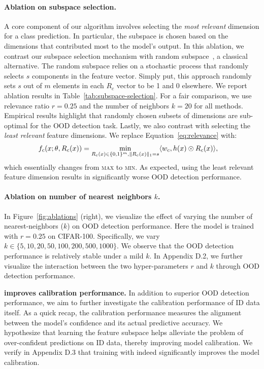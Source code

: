 \paragraph{Ablation on subspace selection.} A core component of our algorithm involves selecting the  \emph{most relevant} dimension for a class prediction. In particular, the subspace is chosen based on the dimensions that contributed most to the model's output. In this ablation, we contrast our subspace selection mechanism with random subspace~\cite{ho1998nearest}, a classical alternative. The random subspace relies on a stochastic process that randomly selects $s$ components in the feature vector. Simply put, this approach randomly sets $s$ out of $m$ elements in each $R_c$ vector to be 1 and 0 elsewhere. We report ablation results  in Table~\ref{tab:subspace-selection}. For a fair comparison, we use relevance ratio $r = 0.25$ and the number of neighbors $k = 20$ for all methods.  Empirical results highlight that randomly chosen subsets of dimensions are sub-optimal for the OOD detection task. Lastly, we also contrast with selecting the \emph{least relevant} feature dimensions. We replace Equation~\ref{eq:relevance} with: 
\begin{align}
     f_c(\*x; \theta, R_c(\*x)) & =  \min_{R_c(\*x)\in \{0,1\}^m, \|R_c(\*x)\|_1 = s} \langle \*w_c, h(\*x) \odot R_c(\*x) \rangle,
     \label{eq:least_relevance}
\end{align}
which essentially changes from \textsc{max} to \textsc{min}.  As expected, using the least relevant feature dimension results in significantly worse OOD detection performance.


\paragraph{Ablation on number of nearest neighbors $k$.} 
In Figure~\ref{fig:ablations} (right), we visualize the effect of varying the number of nearest-neighbors ($k$) on OOD detection performance. Here the model is trained with $r=0.25$ on CIFAR-100. Specifically, we vary $k \in \{5,10,20,50,100,200,500,1000\}$. We observe that the  OOD detection performance is relatively stable under a mild $k$. In Appendix D.2, we further visualize the interaction between the two hyper-parameters $r$ and $k$ through OOD detection performance. 

\vspace{0.1cm}
\noindent\textbf{\name improves calibration performance.} {
In addition to superior OOD detection performance, we aim to further  investigate the calibration performance of ID data itself. As a quick recap,  the calibration performance measures the alignment between the model's confidence and its actual predictive accuracy. We hypothesize that learning the feature subspace helps alleviate the problem of over-confident predictions on ID data, thereby improving model calibration. We verify in  Appendix D.3 that training with \name indeed significantly improves the model calibration. }

